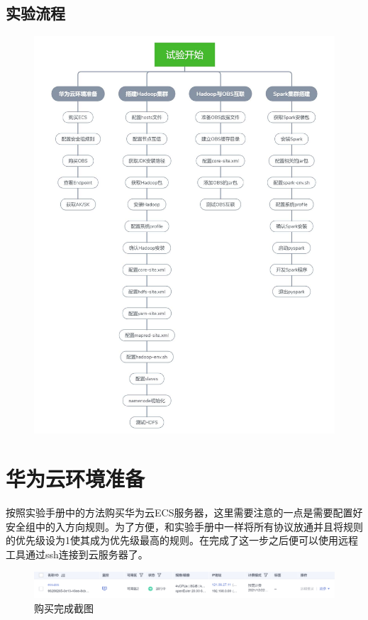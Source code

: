 \documentclass{../source/zjureport}
\begin{document}
        \subsection{实验流程}
        \begin{figure}[H]
            \centering
            \includegraphics[scale = 0.9]{figure/实验流程.jpg}
        \end{figure}

    \section{华为云环境准备}
        按照实验手册中的方法购买华为云ECS服务器，这里需要注意的一点是需要配置好安全组中的入方向规则。为了方便，和实验手册中一样将所有协议放通并且将规则的优先级设为1使其成为优先级最高的规则。在完成了这一步之后便可以使用远程工具通过ssh连接到云服务器了。
        \begin{figure}[H]
            \centering
            \includegraphics[width = \textwidth]{figure/购买ECS}
            \caption*{购买完成截图}
        \end{figure}
\end{document}
